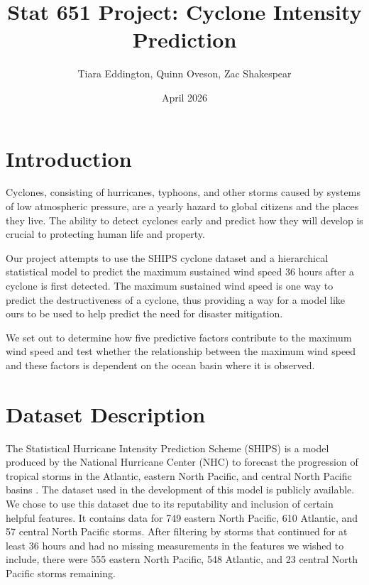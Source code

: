 \documentclass[12pt]{article}
\begin{document}
\title{Stat 651 Project: Cyclone Intensity Prediction}
\author{Tiara Eddington, Quinn Oveson, Zac Shakespear}
\date{April 2026}

\maketitle

\section{Introduction}
Cyclones, consisting of hurricanes, typhoons, and other storms caused by systems of low atmospheric pressure, are a yearly hazard to global citizens and the places they live. The ability to detect cyclones early and predict how they will develop is crucial to protecting human life and property.

Our project attempts to use the SHIPS cyclone dataset and a hierarchical statistical model to predict the maximum sustained wind speed 36 hours after a cyclone is first detected. The maximum sustained wind speed is one way to predict the destructiveness of a cyclone, thus providing a way for a model like ours to be used to help predict the need for disaster mitigation.

We set out to determine how five predictive factors contribute to the maximum wind speed and test whether the relationship between the maximum wind speed and these factors is dependent on the ocean basin where it is observed.

\section{Dataset Description}

The Statistical Hurricane Intensity Prediction Scheme (SHIPS) is a model produced by the National Hurricane Center (NHC) to forecast the progression of tropical storms in the Atlantic, eastern North Pacific, and central North Pacific basins \cite{ships_dataset}. The dataset used in the development of this model is publicly available. We chose to use this dataset due to its reputability and inclusion of certain helpful features. It contains data for 749 eastern North Pacific, 610 Atlantic, and 57 central North Pacific storms. After filtering by storms that continued for at least 36 hours and had no missing measurements in the features we wished to include, there were 555 eastern North Pacific, 548 Atlantic, and 23 central North Pacific storms remaining.
\end{document}
